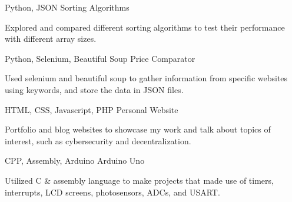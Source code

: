 

\begin{cventries}

      \cventry
        {Python, JSON} %
        {Sorting Algorithms} %
        {} %
        {} %
        {
          \begin{cvitems} %
            \item {Explored and compared different sorting algorithms to test their performance with different array sizes.}
          \end{cvitems}
        }

    \cventry
        {Python, Selenium, Beautiful Soup} %
        {Price Comparator} %
        {} %
        {} %
        {
        \begin{cvitems} %
            \item {Used selenium and beautiful soup to gather information from specific websites using keywords, and store the data in JSON files.}
        \end{cvitems}
        }

    \cventry
        {HTML, CSS, Javascript, PHP} %
        {Personal Website} %
        {} %
        {} %
        {
            \begin{cvitems} %
            \item {Portfolio and blog websites to showcase my work and talk about topics of interest, such as cybersecurity and decentralization.}
            \end{cvitems}
        }

    \cventry
      {CPP, Assembly, Arduino} %
      {Arduino Uno} %
      {} %
      {} %
      {
          \begin{cvitems} %
          \item {Utilized C \& assembly language to make projects that made use of timers, interrupts, LCD screens, photosensors, ADCs, and USART.}
          \end{cvitems}
      }
    \end{cventries}
    